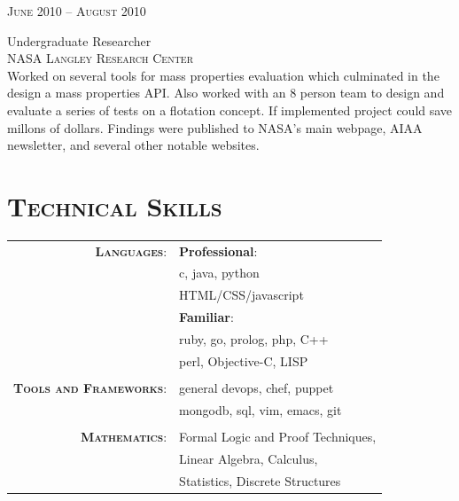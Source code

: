 \documentclass[10pt]{article}
\begin{document}
\begin{minipage}[t]{0.5\textwidth}
   \raggedleft
   \textsc{\normalsize June 2010 -- August 2010}\par
   \raggedright\large Undergraduate Researcher\\
   \textsc{NASA Langley Research Center}\\
   \normalsize{Worked on several tools for mass properties evaluation
   which culminated in the design a mass properties API. Also worked
   with an 8 person team to design and evaluate a series of tests on
   a flotation concept. If implemented project could save millons of
   dollars. Findings were published to NASA's main webpage, AIAA
   newsletter, and several other notable websites.}\\[5pt]

\section{\textsc{Technical Skills}}
   \begin{tabular}{rl}
      \textbf{\textsc{Languages}}:
                        & \textbf{Professional}:\\
                        & c, java, python\\
                        & HTML/CSS/javascript\\
                        & \textbf{Familiar}:\\
                        & ruby, go, prolog, php, C++\\
                        & perl, Objective-C, LISP\\
                        & \\
      \textbf{\textsc{Tools and Frameworks}}:
                        & general devops, chef, puppet\\
                        & mongodb, sql, vim, emacs, git\\
                        & \\
      \textbf{\textsc{Mathematics}}:
                        & Formal Logic and Proof Techniques,\\
                        & Linear Algebra, Calculus,\\
                        & Statistics, Discrete Structures\\
\end{tabular}
\end{minipage}
\hfill
\end{document}
